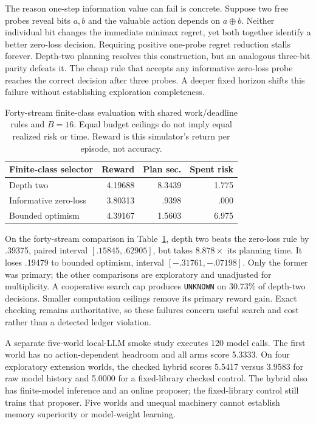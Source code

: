 \documentclass[10pt,twocolumn]{article}
\newcommand{\code}[1]{\texttt{\small #1}}
\begin{document}
The reason one-step information value can fail is concrete. Suppose two free
probes reveal bits $a,b$ and the valuable action depends on $a\oplus b$.
Neither individual bit changes the immediate minimax regret, yet both together
identify a better zero-loss decision. Requiring positive one-probe regret
reduction stalls forever. Depth-two planning resolves this construction, but
an analogous three-bit parity defeats it. The cheap rule that accepts any
informative zero-loss probe reaches the correct decision after three probes.
A deeper fixed horizon shifts this failure without establishing exploration
completeness.

\begin{table}[t]
\centering\small\setlength{\tabcolsep}{4pt}
\begin{tabular}{lrrr}
\toprule
Finite-class selector & Reward & Plan sec. & Spent risk\\
\midrule
Depth two & 4.19688 & 8.3439 & 1.775\\
Informative zero-loss & 3.80313 & .9398 & .000\\
Bounded optimism & 4.39167 & 1.5603 & 6.975\\
\bottomrule
\end{tabular}
\caption{Forty-stream finite-class evaluation with shared work/deadline rules
and $B=16$. Equal budget ceilings do not imply equal realized risk or time.
Reward is this simulator's return per episode, not accuracy.}\label{tab:planning}
\end{table}

On the forty-stream comparison in Table~\ref{tab:planning}, depth two beats the
zero-loss rule by .39375, paired interval $[.15845,.62905]$, but takes
$8.878\times$ its planning time. It loses .19479 to bounded optimism, interval
$[-.31761,-.07198]$. Only the former was primary; the other comparisons are
exploratory and unadjusted for multiplicity. A cooperative search cap produces
\code{UNKNOWN} on 30.73\% of depth-two decisions. Smaller computation ceilings
remove its primary reward gain. Exact checking remains authoritative, so these
failures concern useful search and cost rather than a detected ledger violation.

A separate five-world local-LLM smoke study executes 120 model calls. The first
world has no action-dependent headroom and all arms score 5.3333. On four
exploratory extension worlds, the checked hybrid scores 5.5417 versus 3.9583
for raw model history and 5.0000 for a fixed-library checked control. The hybrid
also has finite-model inference and an online proposer; the fixed-library
control still trains that proposer. Five worlds and unequal machinery cannot
establish memory superiority or model-weight learning.
\end{document}
